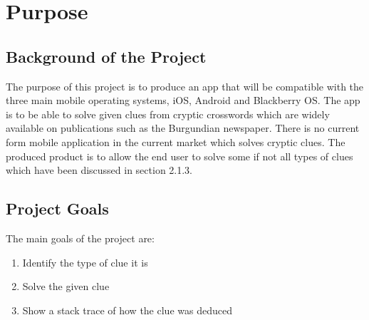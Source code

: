 \section{Purpose}

\subsection{Background of the Project}

The purpose of this project is to produce an app that will be compatible with the three main mobile operating systems, iOS, Android and Blackberry OS. The app is to be able to solve given clues from cryptic crosswords which are widely available on publications such as the Burgundian newspaper. There is no current form mobile application in the current market which solves cryptic clues. The produced product is to allow the end user to solve some if not all types of clues which have been discussed in section 2.1.3.

\subsection{Project Goals}

The main goals of the project are:

\begin{enumerate}
  \item Identify the type of clue it is
  \item Solve the given clue
  \item Show a stack trace of how the clue was deduced
\end{enumerate}

